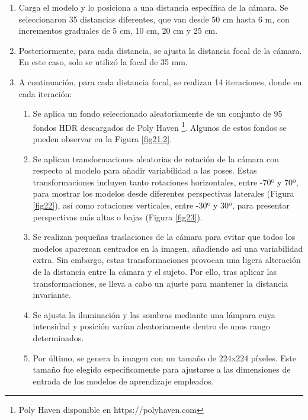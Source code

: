 \begin{enumerate}
	\item Carga el modelo y lo posiciona a una distancia específica de la cámara. Se seleccionaron 35 distancias diferentes, que van desde 50 cm hasta 6 m, con incrementos graduales de 5 cm, 10 cm, 20 cm y 25 cm.
	\item Posteriormente, para cada distancia, se ajusta la distancia focal de la cámara. En este caso, solo se utilizó la focal de 35 mm.
	\item A continuación, para cada distancia focal, se realizan 14 iteraciones, donde en cada iteración:
	\begin{enumerate}
		\item Se aplica un fondo seleccionado aleatoriamente de un conjunto de 95 fondos HDR descargados de Poly Haven \footnote{Poly Haven disponible en https://polyhaven.com}. Algunos de estos fondos se pueden observar en la Figura \ref{fig21.2}.
		\item Se aplican transformaciones aleatorias de rotación de la cámara con respecto al modelo para añadir variabilidad a las poses. Estas transformaciones incluyen tanto rotaciones horizontales, entre -70º y 70º, para mostrar los modelos desde diferentes perspectivas laterales (Figura \ref{fig22}), así como rotaciones verticales, entre -30º y 30º, para presentar perspectivas más altas o bajas (Figura \ref{fig23}).
		\item Se realizan pequeñas traslaciones de la cámara para evitar que todos los modelos aparezcan centrados en la imagen, añadiendo así una variabilidad extra. Sin embargo, estas transformaciones provocan una ligera alteración de la distancia entre la cámara y el sujeto. Por ello, tras aplicar las transformaciones, se lleva a cabo un ajuste para mantener la distancia invariante.
		\item Se ajusta la iluminación y las sombras mediante una lámpara cuya intensidad y posición varían aleatoriamente dentro de unos rango determinados.
		\item Por último, se genera la imagen con un tamaño de 224x224 píxeles. Este tamaño fue elegido específicamente para ajustarse a las dimensiones de entrada de los modelos de aprendizaje empleados.
	\end{enumerate}
\end{enumerate}

